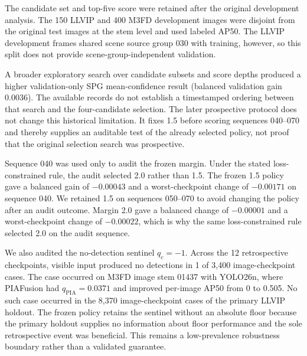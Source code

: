 \documentclass[11pt]{article}
\begin{document}
The candidate set and top-five score were retained after the original
development analysis. The 150 LLVIP and 400 M3FD development images were
disjoint from the original test images at the stem level and used labeled AP50.
The LLVIP development frames shared scene source group 030 with training,
however, so this split does not provide scene-group-independent validation.

A broader exploratory search over candidate subsets and score depths produced a
higher validation-only SPG mean-confidence result (balanced validation gain
0.0036). The available records do not establish a timestamped ordering between
that search and the four-candidate selection. The later prospective protocol
does not change this historical limitation. It fixes 1.5 before scoring
sequences 040--070 and thereby supplies an auditable test of the already
selected policy, not proof that the original selection search was prospective.

Sequence 040 was used only to audit the frozen margin. Under the stated
loss-constrained rule, the audit selected 2.0 rather than 1.5. The frozen 1.5
policy gave a balanced gain of \(-0.00043\) and a worst-checkpoint change of
\(-0.00171\) on sequence 040. We retained 1.5 on sequences 050--070 to avoid
changing the policy after an audit outcome. Margin 2.0 gave a balanced change
of \(-0.00001\) and a worst-checkpoint change of \(-0.00022\), which is why the
same loss-constrained rule selected 2.0 on the audit sequence.

We also audited the no-detection sentinel \(q_c=-1\). Across the 12
retrospective checkpoints, visible input produced no detections in 1 of 3,400
image-checkpoint cases. The case occurred on M3FD image stem 01437 with
YOLO26n, where PIAFusion had \(q_{\mathrm{PIA}}=0.0371\) and improved
per-image AP50 from 0 to 0.505. No such case occurred in the 8,370
image-checkpoint cases of the primary LLVIP holdout. The frozen policy retains
the sentinel without an absolute floor because the primary holdout supplies no
information about floor performance and the sole retrospective event was
beneficial. This remains a low-prevalence robustness boundary rather than a
validated guarantee.
\end{document}
